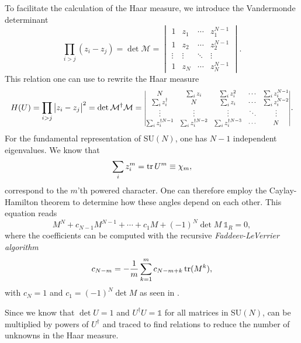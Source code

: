 To facilitate the calculation of the Haar measure, we introduce the Vandermonde
determinant
%
\begin{equation}
  \prod_{i>j} (z_i - z_j) = \det \mathcal{M} =
  \begin{vmatrix}
    1 & z_1 & \cdots & z_1^{N-1} \\
    1 & z_2 & \cdots & z_2^{N-1} \\
    \vdots & \vdots & \ddots & \vdots \\
    1 & z_N & \cdots & z_N^{N-1} 
  \end{vmatrix}.
\end{equation}
%
This relation one can use to rewrite the Haar measure
%
\begin{equation}
  H(U) = \prod_{i>j} \big| z_i - z_j \big|^2
   = \det \mathcal{M}^{\dagger} \mathcal{M} = \scalemath{0.8}{%
  \begin{vmatrix}
    N & \sum_i z_i & \sum_i z_i^2 & \cdots & \sum_i z_i^{N-1} \\
    \sum_i z_i^{\dagger} & N & \sum_i z_i & \cdots & \sum_i z_i^{N-2} \\
    \vdots & \vdots & \vdots & \ddots & \vdots \\
    \sum_i z_i^{\dagger N-1} & \sum_i z_i^{\dagger N-2} & \sum_i z_i^{\dagger N-3} & \cdots & N
  \end{vmatrix}}.
\end{equation}
%
For the fundamental representation of SU$(N)$, one has $N - 1$ independent
eigenvalues. We know that
%
\begin{equation}
  \sum_i z_i^m = \operatorname{tr} U^m \equiv \chi_m,
\end{equation}
%
correspond to the $m$'th powered character. One can therefore employ the
Caylay-Hamilton theorem to determine how these angles depend on each other.
This equation reads
%
\begin{equation} \label{eq-caylay-hamilton}
  M^N + c_{N-1} M^{N-1} + \cdots + c_1 M + (-1)^N \det M\: \mathbb{1}_R = 0,
\end{equation}
%
where the coefficients can be computed with the recursive \emph{Faddeev-LeVerrier
algorithm}
%
\begin{equation}
  c_{N-m} = -\frac{1}{m} \sum_{k=1}^m c_{N-m+k} \operatorname{tr} (M^k),
\end{equation}
%
with $c_N = 1$ and $c_1 = (-1)^N \det M$ as seen in .

Since we know that $\det U = 1$ and $U^{\dagger} U = \mathbb{1}$ for all
matrices in SU$(N)$,  can be multiplied by powers of
$U^{\dagger}$ and traced to find relations to reduce the number of unknowns in
the Haar measure.

